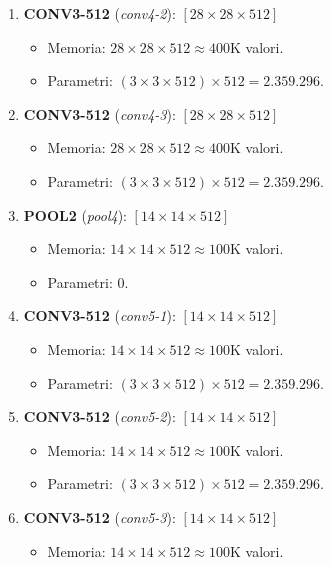 ﻿\documentclass[11pt, a4paper]{article}
\begin{document}
\begin{enumerate}[noitemsep]
\begin{itemize}
    \end{itemize}
    \item \textbf{CONV3-512} (\emph{conv4-2}): $[28 \times 28 \times 512]$
    \begin{itemize}
        \item Memoria: $28 \times 28 \times 512 \approx 400\text{K}$ valori.
        \item Parametri: $(3 \times 3 \times 512) \times 512 = 2.359.296$.
    \end{itemize}
    \item \textbf{CONV3-512} (\emph{conv4-3}): $[28 \times 28 \times 512]$
    \begin{itemize}
        \item Memoria: $28 \times 28 \times 512 \approx 400\text{K}$ valori.
        \item Parametri: $(3 \times 3 \times 512) \times 512 = 2.359.296$.
    \end{itemize}
    \item \textbf{POOL2} (\emph{pool4}): $[14 \times 14 \times 512]$
    \begin{itemize}
        \item Memoria: $14 \times 14 \times 512 \approx 100\text{K}$ valori.
        \item Parametri: $0$.
    \end{itemize}
    \item \textbf{CONV3-512} (\emph{conv5-1}): $[14 \times 14 \times 512]$
    \begin{itemize}
        \item Memoria: $14 \times 14 \times 512 \approx 100\text{K}$ valori.
        \item Parametri: $(3 \times 3 \times 512) \times 512 = 2.359.296$.
    \end{itemize}
    \item \textbf{CONV3-512} (\emph{conv5-2}): $[14 \times 14 \times 512]$
    \begin{itemize}
        \item Memoria: $14 \times 14 \times 512 \approx 100\text{K}$ valori.
        \item Parametri: $(3 \times 3 \times 512) \times 512 = 2.359.296$.
    \end{itemize}
    \item \textbf{CONV3-512} (\emph{conv5-3}): $[14 \times 14 \times 512]$
    \begin{itemize}
        \item Memoria: $14 \times 14 \times 512 \approx 100\text{K}$ valori.

\end{itemize}
\end{enumerate}
\end{document}
